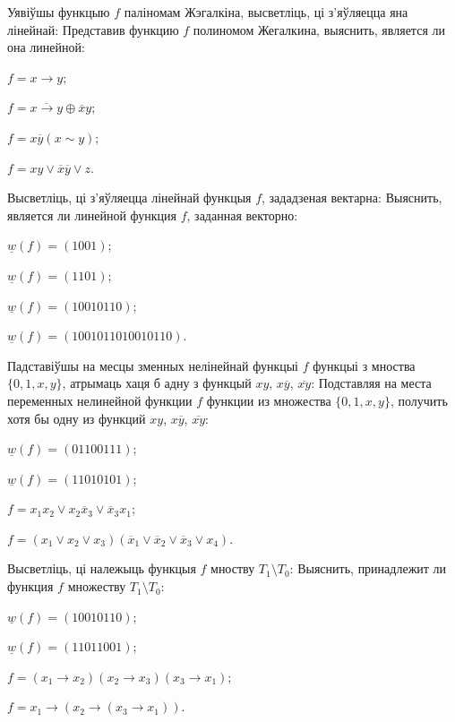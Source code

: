 \documentclass[12pt, a4paper]{article}
\begin{document}
\begin{problemList}
\problemItemWithCommonPart
{Уявіўшы функцыю $f$ паліномам Жэгалкіна, высветліць, ці з'яўляецца яна лінейнай:}
{Представив функцию $f$ полиномом Жегалкина, выяснить, является ли она линейной:}
{%
\begin{belarusianEnumerateMulticol}
    \item $f=x\rightarrow y$;
    \item $f=\overline{x\rightarrow y}\oplus\overline{x}y$;
    \item $f=x\overline{y}(x\sim y)$;
    \item $f=xy\vee\overline{x}\overline{y}\vee z$.
\end{belarusianEnumerateMulticol}
}

\problemItemWithCommonPart
{Высветліць, ці з'яўляецца лінейнай функцыя $f$, зададзеная вектарна:}
{Выяснить, является ли линейной функция $f$, заданная векторно:}
{%
\begin{belarusianEnumerateMulticol}
    \item $\underline{w}(f)=(1001)$;
    \item $\underline{w}(f)=(1101)$;
    \item $\underline{w}(f)=(10010110)$;
    \item $\underline{w}(f)=(1001011010010110)$.
\end{belarusianEnumerateMulticol}
}

\smallskip

\problemItemWithCommonPart
{Падставіўшы на месцы зменных нелінейнай функцыі $f$ функцыі з мноства $\{0, 1, x, y\}$,
атрымаць хаця б адну з функцый $xy$, $x\overline{y}$, $\overline{xy}$:}
{Подставляя на места переменных нелинейной функции $f$ функции из множества $\{0, 1, x, y\}$,
получить хотя бы одну из функций $xy$, $x\overline{y}$, $\overline{xy}$:}
{%
\begin{belarusianEnumerateMulticol}
    \item $\underline{w}(f)=(01100111)$;
    \item $\underline{w}(f)=(11010101)$;
    \item $f=x_1x_2\vee x_2\overline{x}_3\vee \overline{x}_3x_1$;
    \item $f=(x_1\vee x_2\vee x_3)(\overline{x}_1\vee \overline{x}_2\vee \overline{x}_3\vee x_4)$.
\end{belarusianEnumerateMulticol}
}

\smallskip

\problemItemWithCommonPart
{Высветліць, ці належыць функцыя $f$ мноству $T_1\setminus T_0$:}
{Выяснить, принадлежит ли функция $f$ множеству $T_1\setminus T_0$:}
{%
\begin{belarusianEnumerateMulticol}
    \item $\underline{w}(f)=(10010110)$;
    \item $\underline{w}(f)=(11011001)$;
    \item $f=(x_1\rightarrow x_2)(x_2\rightarrow x_3)(x_3 \rightarrow x_1)$;
    \item $f=x_1\rightarrow (x_2 \rightarrow (x_3 \rightarrow x_1))$.
\end{belarusianEnumerateMulticol}
}


\end{problemList}
\end{document}
